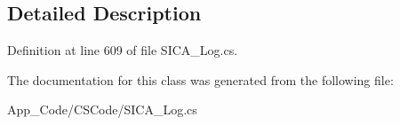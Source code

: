 \subsection{Detailed Description}


Definition at line 609 of file S\+I\+C\+A\+\_\+\+Log.\+cs.



The documentation for this class was generated from the following file\+:\begin{DoxyCompactItemize}
\item 
App\+\_\+\+Code/\+C\+S\+Code/S\+I\+C\+A\+\_\+\+Log.\+cs\end{DoxyCompactItemize}
